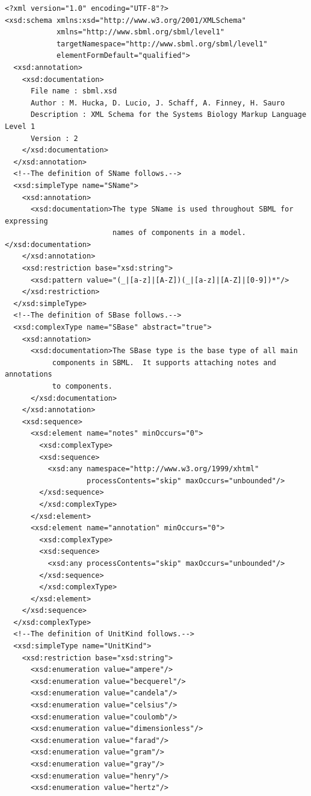 \documentclass[10pt]{cekarticle}
\newenvironment{blockChanged}{\color{BrickRed}}{}
\begin{document}
\begin{blockChanged}
\begin{small}
\tightspacing
\begin{verbatim}
<?xml version="1.0" encoding="UTF-8"?>
<xsd:schema xmlns:xsd="http://www.w3.org/2001/XMLSchema"
            xmlns="http://www.sbml.org/sbml/level1"
            targetNamespace="http://www.sbml.org/sbml/level1"
            elementFormDefault="qualified">
  <xsd:annotation>
    <xsd:documentation>
      File name : sbml.xsd
      Author : M. Hucka, D. Lucio, J. Schaff, A. Finney, H. Sauro
      Description : XML Schema for the Systems Biology Markup Language Level 1
      Version : 2
    </xsd:documentation>
  </xsd:annotation>
  <!--The definition of SName follows.-->
  <xsd:simpleType name="SName">
    <xsd:annotation>
      <xsd:documentation>The type SName is used throughout SBML for expressing 
                         names of components in a model.</xsd:documentation>
    </xsd:annotation>
    <xsd:restriction base="xsd:string">
      <xsd:pattern value="(_|[a-z]|[A-Z])(_|[a-z]|[A-Z]|[0-9])*"/>
    </xsd:restriction>
  </xsd:simpleType>
  <!--The definition of SBase follows.-->
  <xsd:complexType name="SBase" abstract="true">
    <xsd:annotation>
      <xsd:documentation>The SBase type is the base type of all main
           components in SBML.  It supports attaching notes and annotations
           to components.
      </xsd:documentation>
    </xsd:annotation>
    <xsd:sequence>
      <xsd:element name="notes" minOccurs="0">
      	<xsd:complexType>
        <xsd:sequence>
          <xsd:any namespace="http://www.w3.org/1999/xhtml"
                   processContents="skip" maxOccurs="unbounded"/>
        </xsd:sequence>
      	</xsd:complexType>
      </xsd:element>
      <xsd:element name="annotation" minOccurs="0">
      	<xsd:complexType>
        <xsd:sequence>
          <xsd:any processContents="skip" maxOccurs="unbounded"/>
        </xsd:sequence>
      	</xsd:complexType>
      </xsd:element>
    </xsd:sequence>
  </xsd:complexType>
  <!--The definition of UnitKind follows.-->
  <xsd:simpleType name="UnitKind">
    <xsd:restriction base="xsd:string">
      <xsd:enumeration value="ampere"/>
      <xsd:enumeration value="becquerel"/>
      <xsd:enumeration value="candela"/>
      <xsd:enumeration value="celsius"/>
      <xsd:enumeration value="coulomb"/>
      <xsd:enumeration value="dimensionless"/>
      <xsd:enumeration value="farad"/>
      <xsd:enumeration value="gram"/>
      <xsd:enumeration value="gray"/>
      <xsd:enumeration value="henry"/>
      <xsd:enumeration value="hertz"/>

\end{verbatim}
\end{small}
\end{blockChanged}
\end{document}
